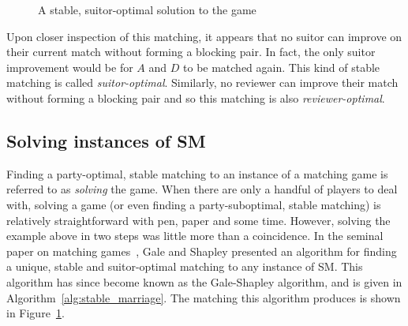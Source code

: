 \begin{figure}[htbp]
    \centering
    
    \caption{A stable, suitor-optimal solution to the game}\label{fig:sm_stable}
\end{figure}

Upon closer inspection of this matching, it appears that no suitor can improve
on their current match without forming a blocking pair. In fact, the only suitor
improvement would be for \(A\) and \(D\) to be matched again. This kind of
stable matching is called \emph{suitor-optimal}. Similarly, no reviewer can
improve their match without forming a blocking pair and so this matching is also
\emph{reviewer-optimal}.

\subsection{Solving instances of SM}

Finding a party-optimal, stable matching to an instance of a matching game is
referred to as \emph{solving} the game. When there are only a handful of players
to deal with, solving a game (or even finding a party-suboptimal, stable
matching) is relatively straightforward with pen, paper and some time. However,
solving the example above in two steps was little more than a coincidence. 
In the seminal paper on matching games~\cite{Gale1962}, Gale and Shapley
presented an algorithm for finding a unique, stable and suitor-optimal matching
to any instance of SM. This algorithm has since become known as the Gale-Shapley
algorithm, and is given in Algorithm~\ref{alg:stable_marriage}. The matching
this algorithm produces is shown in Figure~\ref{fig:sm_stable}.

\balg%
\caption{The suitor-optimal algorithm for SM}\label{alg:stable_marriage}

\vspace{1em}

\ealg%

